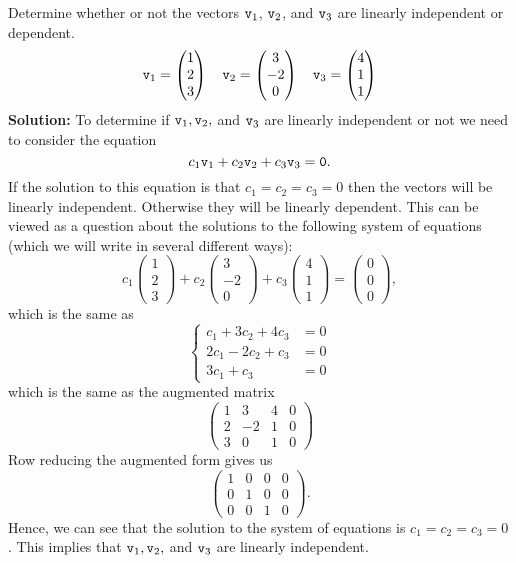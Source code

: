 \begin{example}
Determine whether or not the vectors $\texttt{v}_1$, $\texttt{v}_2$, and $\texttt{v}_3$ are linearly independent or
dependent.
\[ \texttt{v}_1 = \begin{pmatrix} 1 \\ 2 \\ 3 \end{pmatrix} \quad \texttt{v}_2 = \begin{pmatrix} 3 \\ -2 \\
    0 \end{pmatrix} \quad \texttt{v}_3 = \begin{pmatrix} 4 \\ 1 \\ 1 \end{pmatrix} \]
{\bf Solution:} 
To determine if $\texttt{v}_1, \texttt{v}_2,$ and $\texttt{v}_3$ are linearly independent or not we need to
consider the equation
\[ c_1 \texttt{v}_1 + c_2 \texttt{v}_2 + c_3 \texttt{v}_3 = \texttt{0}. \]
If the solution to this equation is that $c_1 = c_2 = c_3 = 0$ then the vectors will be
linearly independent.  Otherwise they will be linearly dependent.  This can be viewed as a
question about the solutions to the following system of equations (which we will write in
several different ways):
\[ c_1 \begin{pmatrix} 1 \\ 2 \\ 3 \end{pmatrix} + c_2 \begin{pmatrix} 3 \\ -2 \\ 0
    \end{pmatrix} + c_3 \begin{pmatrix} 4 \\ 1 \\ 1 \end{pmatrix} = \begin{pmatrix} 0 \\
    0 \\ 0 \end{pmatrix}, \]
which is the same as 
\[ \left\{ \begin{array}{cl} c_1 + 3c_2 + 4c_3 &= 0 \\ 2c_1 - 2c_2 + c_3 &= 0 \\ 3c_1 +
    c_3 &= 0 \end{array} \right. \]
which is the same as the augmented matrix
\[ \left( \begin{array}{ccc|c} 1 & 3 & 4 & 0 \\ 2 & -2 & 1 & 0 \\ 3 & 0 & 1 & 0 \end{array}
\right) \]
Row reducing the augmented form gives us
\[ \left( \begin{array}{ccc|c} 1 & 0 & 0 & 0 \\ 0 & 1 & 0 & 0 \\ 0 & 0 & 1 & 0 \end{array}
\right). \]
Hence, we can see that the solution to the system of equations is $c_1 = c_2 = c_3 = 0$.
This implies that $\texttt{v}_1, \texttt{v}_2,$ and $\texttt{v}_3$ are linearly independent.
\end{example}

